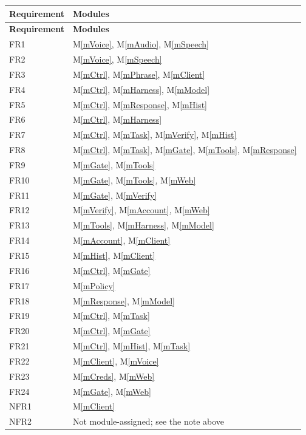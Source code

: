 \documentclass[12pt, titlepage]{article}
\newcommand{\mref}[1]{M\ref{#1}}
\begin{document}
\begin{longtable}{|l|l|}
\hline
\textbf{Requirement} & \textbf{Modules}\\
\hline
\endfirsthead
\hline
\textbf{Requirement} & \textbf{Modules}\\
\hline
\endhead
\hline
\endfoot
FR1 & \mref{mVoice}, \mref{mAudio}, \mref{mSpeech}\\
\hline
FR2 & \mref{mVoice}, \mref{mSpeech}\\
\hline
FR3 & \mref{mCtrl}, \mref{mPhrase}, \mref{mClient}\\
\hline
FR4 & \mref{mCtrl}, \mref{mHarness}, \mref{mModel}\\
\hline
FR5 & \mref{mCtrl}, \mref{mResponse}, \mref{mHist}\\
\hline
FR6 & \mref{mCtrl}, \mref{mHarness}\\
\hline
FR7 & \mref{mCtrl}, \mref{mTask}, \mref{mVerify}, \mref{mHist}\\
\hline
FR8 & \mref{mCtrl}, \mref{mTask}, \mref{mGate}, \mref{mTools}, \mref{mResponse}\\
\hline
FR9 & \mref{mGate}, \mref{mTools}\\
\hline
FR10 & \mref{mGate}, \mref{mTools}, \mref{mWeb}\\
\hline
FR11 & \mref{mGate}, \mref{mVerify}\\
\hline
FR12 & \mref{mVerify}, \mref{mAccount}, \mref{mWeb}\\
\hline
FR13 & \mref{mTools}, \mref{mHarness}, \mref{mModel}\\
\hline
FR14 & \mref{mAccount}, \mref{mClient}\\
\hline
FR15 & \mref{mHist}, \mref{mClient}\\
\hline
FR16 & \mref{mCtrl}, \mref{mGate}\\
\hline
FR17 & \mref{mPolicy}\\
\hline
FR18 & \mref{mResponse}, \mref{mModel}\\
\hline
FR19 & \mref{mCtrl}, \mref{mTask}\\
\hline
FR20 & \mref{mCtrl}, \mref{mGate}\\
\hline
FR21 & \mref{mCtrl}, \mref{mHist}, \mref{mTask}\\
\hline
FR22 & \mref{mClient}, \mref{mVoice}\\
\hline
FR23 & \mref{mCreds}, \mref{mWeb}\\
\hline
FR24 & \mref{mGate}, \mref{mWeb}\\
\hline
NFR1 & \mref{mClient}\\
\hline
NFR2 & Not module-assigned; see the note above\\

\end{longtable}
\end{document}
